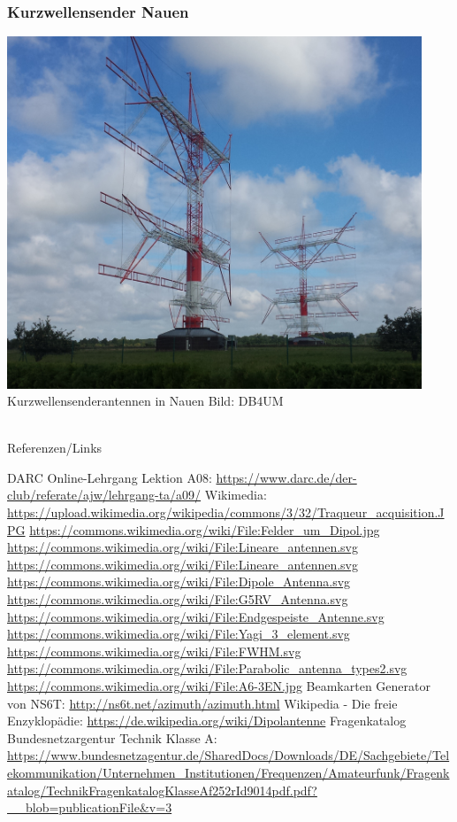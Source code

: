 \begin{frame}
  \frametitle{Kurzwellensender Nauen}
  \begin{center}
    \includegraphics[width=0.93\textwidth]{a09/Nauen_Dipolarray.jpg}\\
    \tiny Kurzwellensenderantennen in Nauen Bild: DB4UM
  \end{center}
\end{frame}



\renewcommand{\refname}{Referenzen}

\hypertarget{refs}{}
\textcolor{white}{} \\ %
\Large Referenzen/Links
\footnotesize

\begin{thebibliography}{}
    DARC Online-Lehrgang Lektion A08:
    \url{https://www.darc.de/der-club/referate/ajw/lehrgang-ta/a09/}
    Wikimedia:
    \url{https://upload.wikimedia.org/wikipedia/commons/3/32/Traqueur_acquisition.JPG}
    \url{https://commons.wikimedia.org/wiki/File:Felder_um_Dipol.jpg}
    \url{https://commons.wikimedia.org/wiki/File:Lineare_antennen.svg}
    \url{https://commons.wikimedia.org/wiki/File:Lineare_antennen.svg}
    \url{https://commons.wikimedia.org/wiki/File:Dipole_Antenna.svg}
    \url{https://commons.wikimedia.org/wiki/File:G5RV_Antenna.svg}
    \url{https://commons.wikimedia.org/wiki/File:Endgespeiste_Antenne.svg}
    \url{https://commons.wikimedia.org/wiki/File:Yagi_3_element.svg}
    \url{https://commons.wikimedia.org/wiki/File:FWHM.svg}
    \url{https://commons.wikimedia.org/wiki/File:Parabolic_antenna_types2.svg}
    \url{https://commons.wikimedia.org/wiki/File:A6-3EN.jpg}
    \url{}
    Beamkarten Generator von NS6T:
    \url{http://ns6t.net/azimuth/azimuth.html}
      Wikipedia - Die freie Enzyklopädie:
    \url{https://de.wikipedia.org/wiki/Dipolantenne}
     Fragenkatalog Bundesnetzargentur Technik Klasse A:
    \url{https://www.bundesnetzagentur.de/SharedDocs/Downloads/DE/Sachgebiete/Telekommunikation/Unternehmen_Institutionen/Frequenzen/Amateurfunk/Fragenkatalog/TechnikFragenkatalogKlasseAf252rId9014pdf.pdf?__blob=publicationFile&v=3}
\end{thebibliography}


